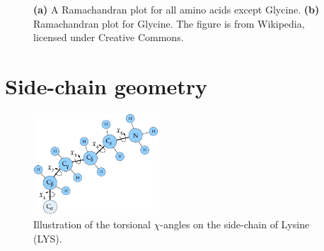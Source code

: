 \begin{figure}
	\centering
    \caption{\textbf{(a)} A Ramachandran plot for all amino
      acids except Glycine. \textbf{(b)}  Ramachandran plot
      for Glycine. The figure is from Wikipedia, licensed under Creative Commons.}
\end{figure}


\section{Side-chain geometry}
\begin{figure}
	\centering
	\includegraphics[width=0.42\textwidth]{figures/lysine}
    \caption{Illustration of the torsional $\chi$-angles on the side-chain of Lysine (LYS).}
    \label{fig:lysine-and-chi}
\end{figure}

